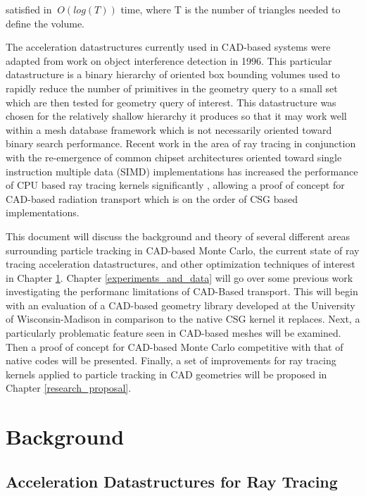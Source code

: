 \documentclass[12pt, a4paper]{article}
\begin{document}
satisfied in $~O(log(T))$ time, where T is the number of triangles needed to define the volume.

The acceleration datastructures currently used in CAD-based systems were adapted from work on object interference detection in 1996\cite{Gottschalk_1996}. This particular datastructure is a binary hierarchy of oriented box bounding volumes used to rapidly reduce the number of primitives in the geometry query to a small set which are then tested for geometry query of interest. This datastructure was chosen for the relatively shallow hierarchy it produces so that it may work well within a mesh database framework which is not necessarily oriented toward binary search performance. Recent work in the area of ray tracing in conjunction with the re-emergence of common chipset architectures oriented toward single instruction multiple data (SIMD) implementations has increased the performance of CPU based ray tracing kernels significantly \cite{Wald_2008}, allowing a proof of concept for CAD-based radiation transport which is on the order of CSG based implementations.

This document will discuss the background and theory of several different areas surrounding particle tracking in CAD-based Monte Carlo, the current state of ray tracing acceleration datastructures, and other optimization techniques of interest in Chapter \ref{background}. Chapter \ref{experiments_and_data} will go over some previous work investigating the performanc limitations of CAD-Based transport. This will begin with an evaluation of a CAD-based geometry library developed at the University of Wisconsin-Madison in comparison to the native CSG kernel it replaces. Next, a particularly problematic feature seen in CAD-based meshes will be examined. Then a proof of concept for CAD-based Monte Carlo competitive with that of native codes will be presented. Finally, a set of improvements for ray tracing kernels applied to particle tracking in CAD geometries will be proposed in Chapter \ref{research_proposal}.


\section{Background}%
\label{background}


\subsection{Acceleration Datastructures for Ray Tracing}
\label{subsec:accel_datastructures}
\end{document}
